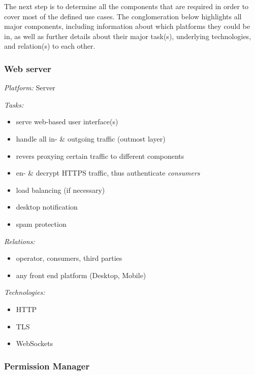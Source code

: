 \documentclass[12pt,english,a4paper,titlepage,cleardoublepage=empty,dottedtoc]{report}
\providecommand{\tightlist}{%
  \setlength{\itemsep}{0pt}\setlength{\parskip}{0pt}}
\begin{document}
The next step is to determine all the components that are required in
order to cover most of the defined use cases. The conglomeration below
highlights all major components, including information about which
platforms they could be in, as well as further details about their major
task(s), underlying technologies, and relation(s) to each other.

\subsubsection*{Web server}\label{web-server}

\emph{Platform:} Server

\emph{Tasks:}

\begin{itemize}
\tightlist
\item
  serve web-based user interface(s)
\item
  handle all in- \& outgoing traffic (outmost layer)
\item
  revers proxying certain traffic to different components
\item
  en- \& decrypt HTTPS traffic, thus authenticate \emph{consumers}
\item
  load balancing (if necessary)
\item
  desktop notification
\item
  spam protection
\end{itemize}

\emph{Relations:}

\begin{itemize}
\tightlist
\item
  operator, consumers, third parties
\item
  any front end platform (Desktop, Mobile)
\end{itemize}

\emph{Technologies:}

\begin{itemize}
\tightlist
\item
  HTTP
\item
  TLS
\item
  WebSockets
\end{itemize}

\subsubsection*{Permission Manager}\label{permission-manager}
\end{document}
